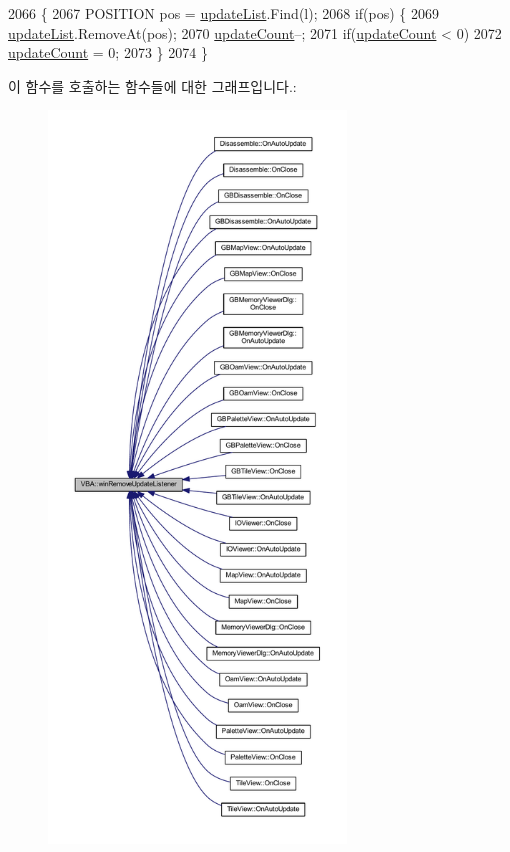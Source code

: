 \begin{DoxyCode}
2066 \{
2067   POSITION pos = \mbox{\hyperlink{class_v_b_a_ad1bea05b3d5cd2fe5c3ea3c98db33ddc}{updateList}}.Find(l);
2068   \textcolor{keywordflow}{if}(pos) \{
2069     \mbox{\hyperlink{class_v_b_a_ad1bea05b3d5cd2fe5c3ea3c98db33ddc}{updateList}}.RemoveAt(pos);
2070     \mbox{\hyperlink{class_v_b_a_a61d96a23607a428ad97f74f4b750fcc2}{updateCount}}--;
2071     \textcolor{keywordflow}{if}(\mbox{\hyperlink{class_v_b_a_a61d96a23607a428ad97f74f4b750fcc2}{updateCount}} < 0)
2072       \mbox{\hyperlink{class_v_b_a_a61d96a23607a428ad97f74f4b750fcc2}{updateCount}} = 0;
2073   \}
2074 \}
\end{DoxyCode}
이 함수를 호출하는 함수들에 대한 그래프입니다.\+:
\nopagebreak
\begin{figure}[H]
\begin{center}
\leavevmode
\includegraphics[height=550pt]{class_v_b_a_a2d31a0656df2230310aa8dc9e3a735d3_icgraph}
\end{center}
\end{figure}
\mbox{\label{class_v_b_a_ae872998a3ecf3ec0d504378744f441e6}} 

